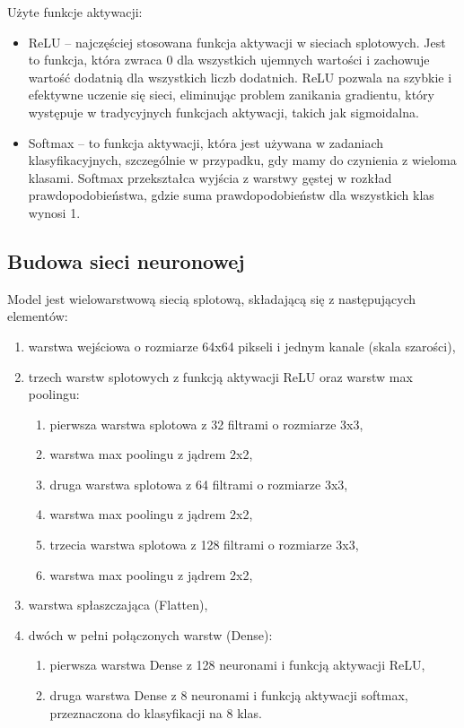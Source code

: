 Użyte funkcje aktywacji:
\begin{itemize}
    \item ReLU -- najczęściej stosowana funkcja aktywacji w sieciach splotowych.
    Jest to funkcja, która zwraca 0 dla wszystkich ujemnych wartości i zachowuje wartość dodatnią dla wszystkich liczb dodatnich.
    ReLU pozwala na szybkie i efektywne uczenie się sieci, eliminując problem zanikania gradientu,
    który występuje w tradycyjnych funkcjach aktywacji, takich jak sigmoidalna.
    \item Softmax -- to funkcja aktywacji, która jest używana w zadaniach klasyfikacyjnych,
    szczególnie w przypadku, gdy mamy do czynienia z wieloma klasami.
    Softmax przekształca wyjścia z warstwy gęstej w rozkład prawdopodobieństwa,
    gdzie suma prawdopodobieństw dla wszystkich klas wynosi 1.
\end{itemize}

\subsection{Budowa sieci neuronowej}\label{subsec:budowa-sieci-neuronowej}

Model jest wielowarstwową siecią splotową, składającą się z następujących elementów:
\begin{enumerate}
    \item warstwa wejściowa o rozmiarze 64x64 pikseli i jednym kanale (skala szarości),
    \item trzech warstw splotowych z funkcją aktywacji ReLU oraz warstw max poolingu:
    \begin{enumerate}
        \item pierwsza warstwa splotowa z 32 filtrami o rozmiarze 3x3,
        \item warstwa max poolingu z jądrem 2x2,
        \item druga warstwa splotowa z 64 filtrami o rozmiarze 3x3,
        \item warstwa max poolingu z jądrem 2x2,
        \item trzecia warstwa splotowa z 128 filtrami o rozmiarze 3x3,
        \item warstwa max poolingu z jądrem 2x2,
    \end{enumerate}
    \item warstwa spłaszczająca (Flatten),
    \item dwóch w pełni połączonych warstw (Dense):
    \begin{enumerate}
        \item pierwsza warstwa Dense z 128 neuronami i funkcją aktywacji ReLU,
        \item druga warstwa Dense z 8 neuronami i funkcją aktywacji softmax, przeznaczona do klasyfikacji na 8 klas.
    \end{enumerate}
\end{enumerate}

